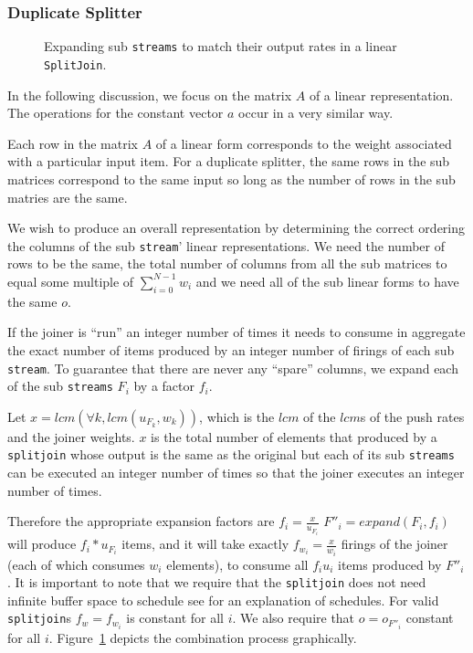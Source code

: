 \subsubsection{Duplicate Splitter}

\begin{figure}
\center
\epsfxsize=3.0in
\caption{Expanding sub {\tt streams} to match their output rates in a linear {\tt SplitJoin}.}
\label{fig:splitjoin-duplicate-ratematch}
\end{figure}

In the following discussion, we focus on the matrix $A$ of a linear representation.
The operations for the constant vector $a$ occur in a very similar way.

Each row in the matrix $A$ of a linear form corresponds to the
weight associated with a particular input item. For a duplicate splitter,
the same rows in the sub matrices correspond to the same
input so long as the number of rows in the sub matries are the same.

We wish to produce an overall representation by determining the correct
ordering the columns of the sub {\tt stream}' linear representations. We
need the number of rows to be the same, the total number of columns 
from all the sub matrices to equal some multiple of $\sum_{i=0}^{N-1}w_i$
and we need all of the sub linear forms to have the same $o$. 

If the joiner is ``run'' an integer number of times it needs to consume in aggregate
the exact number of items produced by an integer number of firings of
each sub {\tt stream}. To guarantee that there are never any ``spare'' columns,
we expand each of the sub {\tt streams} $F_i$ by a factor $f_i$.

Let $x=lcm(\forall k, lcm(u_{F_k},w_k))$, which is the $lcm$ of the $lcm$s of 
the push rates and the joiner weights. $x$ is the total number of elements that 
produced by a {\tt splitjoin} whose output is the same as the original but each 
of its sub {\tt streams} can be executed an integer number of times so that 
the joiner executes an integer number of times.

Therefore the appropriate expansion factors are  $f_i=\frac{x}{u_{F_i}}$ 
$F''_i = expand(F_i,f_i)$ will produce $f_i*u_{F_i}$ items, and it will take 
exactly $f_{w_i}=\frac{x}{w_i}$ firings of the 
joiner (each of which consumes $w_i$ elements), to consume all $f_iu_i$ items produced by $F''_i$.
It is important to note that we require that the {\tt splitjoin} does not need
infinite buffer space to schedule see \cite{karczma-thesis} for an explanation of schedules. 
For valid {\tt splitjoin}s $f_w=f_{w_i}$ is constant for all $i$. We also require that $o=o_{F''_i}$
constant for all $i$. Figure~\ref{fig:splitjoin-duplicate-ratematch} depicts the 
combination process graphically.

